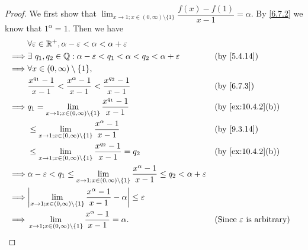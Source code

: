 \begin{proof}
  We first show that \(\lim_{x \to 1 ; x \in (0, \infty) \setminus \{1\}} \dfrac{f(x) - f(1)}{x - 1} = \alpha\).
  By \cref{6.7.2} we know that \(1^{\alpha} = 1\).
  Then we have
  \begin{align*}
             & \forall \varepsilon \in \R^+, \alpha - \varepsilon < \alpha < \alpha + \varepsilon                                                                                                                \\
    \implies & \exists\ q_1, q_2 \in \Q : \alpha - \varepsilon < q_1 < \alpha < q_2 < \alpha + \varepsilon                                                      &  & \text{(by \cref{5.4.14})}                   \\
    \implies & \forall x \in (0, \infty) \setminus \{1\},                                                                                                                                                        \\
             & \dfrac{x^{q_1} - 1}{x - 1} < \dfrac{x^{\alpha} - 1}{x - 1} < \dfrac{x^{q_2} - 1}{x - 1}                                                          &  & \text{(by \cref{6.7.3})}                    \\
    \implies & q_1 = \lim_{x \to 1 ; x \in (0, \infty) \setminus \{1\}} \dfrac{x^{q_1} - 1}{x - 1}                                                              &  & \text{(by \cref{ex:10.4.2}(b))}             \\
             & \leq \lim_{x \to 1 ; x \in (0, \infty) \setminus \{1\}} \dfrac{x^{\alpha} - 1}{x - 1}                                                            &  & \text{(by \cref{9.3.14})}                   \\
             & \leq \lim_{x \to 1 ; x \in (0, \infty) \setminus \{1\}} \dfrac{x^{q_2} - 1}{x - 1} = q_2                                                         &  & \text{(by \cref{ex:10.4.2}(b))}             \\
    \implies & \alpha - \varepsilon < q_1 \leq \lim_{x \to 1 ; x \in (0, \infty) \setminus \{1\}} \dfrac{x^{\alpha} - 1}{x - 1} \leq q_2 < \alpha + \varepsilon                                                  \\
    \implies & \abs{\lim_{x \to 1 ; x \in (0, \infty) \setminus \{1\}} \dfrac{x^{\alpha} - 1}{x - 1} - \alpha} \leq \varepsilon                                                                                  \\
    \implies & \lim_{x \to 1 ; x \in (0, \infty) \setminus \{1\}} \dfrac{x^{\alpha} - 1}{x - 1} = \alpha.                                                       &  & \text{(Since \(\varepsilon\) is arbitrary)}
  \end{align*}


\end{proof}
